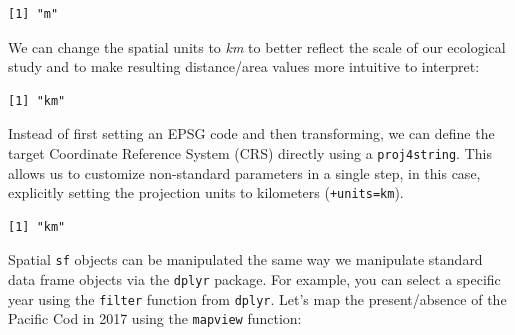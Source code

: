 \documentclass[
  letterpaper,
  DIV=11,
  numbers=noendperiod]{scrartcl}
\newenvironment{Shaded}{\begin{snugshade}}{\end{snugshade}}
\newcommand{\AttributeTok}[1]{\textcolor[rgb]{0.40,0.45,0.13}{#1}}
\newcommand{\FunctionTok}[1]{\textcolor[rgb]{0.28,0.35,0.67}{#1}}
\newcommand{\NormalTok}[1]{\textcolor[rgb]{0.00,0.23,0.31}{#1}}
\newcommand{\OtherTok}[1]{\textcolor[rgb]{0.00,0.23,0.31}{#1}}
\newcommand{\SpecialCharTok}[1]{\textcolor[rgb]{0.37,0.37,0.37}{#1}}
\newcommand{\StringTok}[1]{\textcolor[rgb]{0.13,0.47,0.30}{#1}}
\begin{document}
\begin{verbatim}
[1] "m"
\end{verbatim}

We can change the spatial units to \emph{km} to better reflect the scale
of our ecological study and to make resulting distance/area values more
intuitive to interpret:

\begin{Shaded}
\end{Shaded}

\begin{verbatim}
[1] "km"
\end{verbatim}

Instead of first setting an EPSG code and then transforming, we can
define the target Coordinate Reference System (CRS) directly using a
\texttt{proj4string}. This allows us to customize non-standard
parameters in a single step, in this case, explicitly setting the
projection units to kilometers (\texttt{+units=km}).

\begin{Shaded}
\end{Shaded}

\begin{verbatim}
[1] "km"
\end{verbatim}

Spatial \texttt{sf} objects can be manipulated the same way we
manipulate standard data frame objects via the \texttt{dplyr} package.
For example, you can select a specific year using the \texttt{filter}
function from \texttt{dplyr}. Let's map the present/absence of the
Pacific Cod in 2017 using the \texttt{mapview} function:
\end{document}
